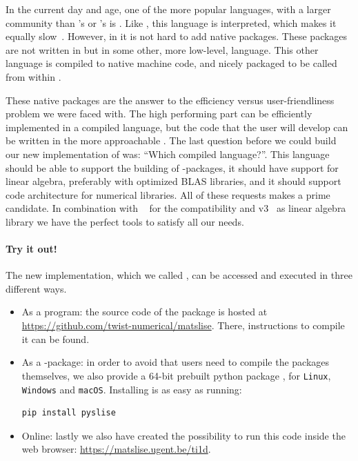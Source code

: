 In the current day and age, one of the more popular languages, with a larger community than \fortran{}'s or \matlab{}'s is \lpython{}. Like \matlab{}, this language is interpreted, which makes it equally slow~\cite{chaves_octave_2006,unpingco_comparative_2008}. However, in \lpython{} it is not hard to add native packages. These packages are not written in \lpython{} but in some other, more low-level, language. This other language is compiled to native machine code, and nicely packaged to be called from within \lpython{}.

These native packages are the answer to the efficiency versus user-friendliness problem we were faced with. The high performing part can be efficiently implemented in a compiled language, but the code that the user will develop can be written in the more approachable \lpython{}. The last question before we could build our new implementation of \matslise{} was: ``Which compiled language?''. This language should be able to support the building of \lpython{}-packages, it should have support for linear algebra, preferably with optimized BLAS libraries, and it should support code architecture for numerical libraries. All of these requests makes \cpp{} a prime candidate. In combination with \pybind{}~\cite{jakob_pybind11_2017} for the \lpython{} compatibility and \Eigen{} v3~\cite{guennebaud_eigen_2010} as linear algebra library we have the perfect tools to satisfy all our needs.

\paragraph{Try it out!} The new implementation, which we called , can be accessed and executed in three different ways.

\begin{itemize}
    \item As a \cpp{} program: the source code of the package is hosted at \url{https://github.com/twist-numerical/matslise}. There, instructions to compile it can be found.
    \item As a \lpython{}-package: in order to avoid that users need to compile the packages themselves, we also provide a 64-bit prebuilt python package \pyslise{}, for \texttt{Linux}, \texttt{Windows} and \texttt{macOS}. Installing \pyslise{} is as easy as running:
\begin{verbatim}
pip install pyslise
\end{verbatim}
    \item Online: lastly we also have created the possibility to run this code inside the web browser: \url{https://matslise.ugent.be/ti1d}.%
\end{itemize}

